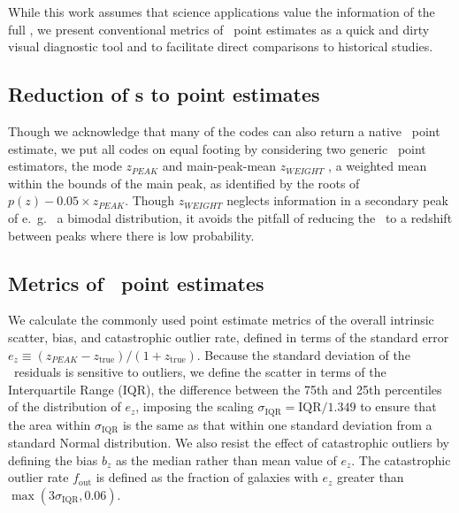 While this work assumes that science applications value the information of the full \pzpdf, we present conventional metrics of \pz\ point estimates as a quick and dirty visual diagnostic tool and to facilitate direct comparisons to historical studies.

\subsection{Reduction of \pzpdf s to point estimates}
\label{sec:pointest}

Though we acknowledge that many of the codes can also return a native \pz\ point estimate, we put all codes on equal footing by considering two generic \pz\ point estimators, the mode $z_{PEAK}$ and main-peak-mean $z_{WEIGHT}$ \citep{Dahlen:13}, a weighted mean within the bounds of the main peak, as identified by the roots of $p(z) - 0.05 \times z_{PEAK}$.
Though $z_{WEIGHT}$ neglects information in a secondary peak of e.~g.~ a bimodal distribution, it avoids the pitfall of reducing the \pzpdf\ to a redshift between peaks where there is low probability.

\subsection{Metrics of \pz\ point estimates}
\label{sec:point_metrics}

We calculate the commonly used point estimate metrics of the overall intrinsic scatter, bias, and catastrophic outlier rate, defined in terms of the standard error $e_{z} \equiv (z_{PEAK} - z_{\mathrm{true}}) / (1 + z_{\mathrm{true}})$.
Because the standard deviation of the \pz\ residuals is sensitive to outliers, we define the scatter in terms of the Interquartile Range (IQR), the difference between the 75th and 25th percentiles of the distribution of $e_{z}$, imposing the scaling $\sigma_{\mathrm{IQR}} = \mathrm{IQR} / 1.349$ to ensure that the area within $\sigma_{\mathrm{IQR}}$ is the same as that within one standard deviation from a standard Normal distribution.
We also resist the effect of catastrophic outliers by defining the bias $b_{z}$ as the median rather than mean value of $e_{z}$.
The catastrophic outlier rate $f_{\mathrm{out}}$ is defined as the fraction of galaxies with $e_{z}$ greater than $\max(3 \sigma_{\mathrm{IQR}}, 0.06)$.


